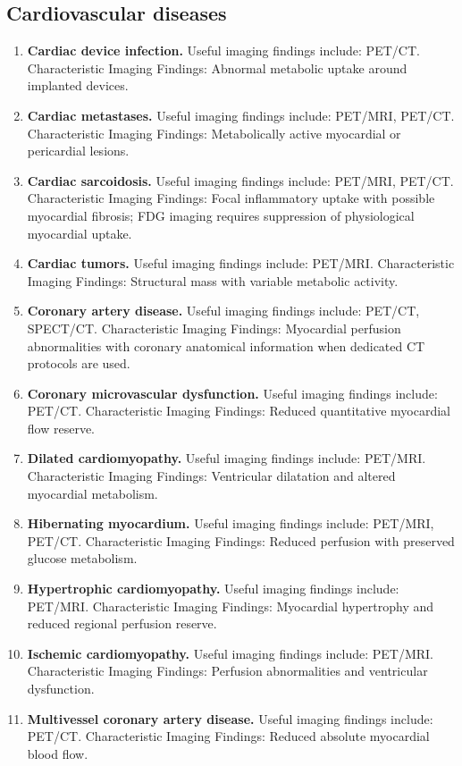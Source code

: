 \subsection{Cardiovascular diseases}
\begin{enumerate}[leftmargin=*,itemsep=0.45em,topsep=0.4em]
\item \textbf{Cardiac device infection.} Useful imaging findings include: PET/CT. Characteristic Imaging Findings: Abnormal metabolic uptake around implanted devices.
\item \textbf{Cardiac metastases.} Useful imaging findings include: PET/MRI, PET/CT. Characteristic Imaging Findings: Metabolically active myocardial or pericardial lesions.
\item \textbf{Cardiac sarcoidosis.} Useful imaging findings include: PET/MRI, PET/CT. Characteristic Imaging Findings: Focal inflammatory uptake with possible myocardial fibrosis; FDG imaging requires suppression of physiological myocardial uptake.
\item \textbf{Cardiac tumors.} Useful imaging findings include: PET/MRI. Characteristic Imaging Findings: Structural mass with variable metabolic activity.
\item \textbf{Coronary artery disease.} Useful imaging findings include: PET/CT, SPECT/CT. Characteristic Imaging Findings: Myocardial perfusion abnormalities with coronary anatomical information when dedicated CT protocols are used.
\item \textbf{Coronary microvascular dysfunction.} Useful imaging findings include: PET/CT. Characteristic Imaging Findings: Reduced quantitative myocardial flow reserve.
\item \textbf{Dilated cardiomyopathy.} Useful imaging findings include: PET/MRI. Characteristic Imaging Findings: Ventricular dilatation and altered myocardial metabolism.
\item \textbf{Hibernating myocardium.} Useful imaging findings include: PET/MRI, PET/CT. Characteristic Imaging Findings: Reduced perfusion with preserved glucose metabolism.
\item \textbf{Hypertrophic cardiomyopathy.} Useful imaging findings include: PET/MRI. Characteristic Imaging Findings: Myocardial hypertrophy and reduced regional perfusion reserve.
\item \textbf{Ischemic cardiomyopathy.} Useful imaging findings include: PET/MRI. Characteristic Imaging Findings: Perfusion abnormalities and ventricular dysfunction.
\item \textbf{Multivessel coronary artery disease.} Useful imaging findings include: PET/CT. Characteristic Imaging Findings: Reduced absolute myocardial blood flow.

\end{enumerate}
